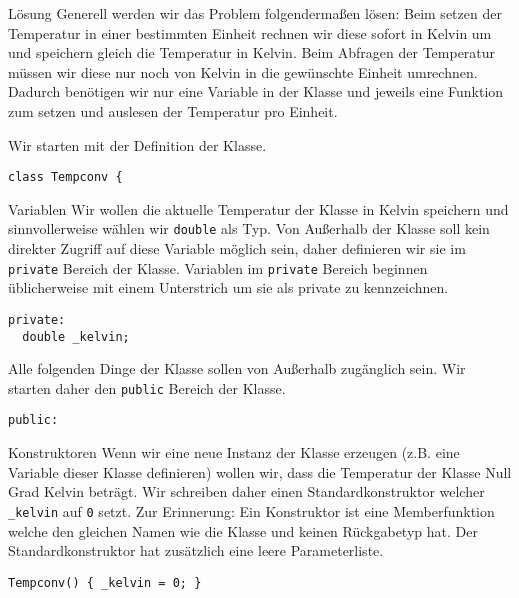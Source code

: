 \documentclass[presentation]{beamer}
\begin{document}
\begin{frame}[label={sec:org40f99e4},fragile]{Lösung}
 Generell werden wir das Problem folgendermaßen lösen: Beim setzen der
Temperatur in einer bestimmten Einheit rechnen wir diese sofort in
Kelvin um und speichern gleich die Temperatur in Kelvin. Beim Abfragen
der Temperatur müssen wir diese nur noch von Kelvin in die gewünschte
Einheit umrechnen. Dadurch benötigen wir nur eine Variable in der
Klasse und jeweils eine Funktion zum setzen und auslesen der
Temperatur pro Einheit.

Wir starten mit der Definition der Klasse.
\begin{verbatim}
class Tempconv {
\end{verbatim}

\begin{block}{Variablen}
Wir wollen die aktuelle Temperatur der Klasse in Kelvin speichern und
sinnvollerweise wählen wir {\color{solarizedYellow}\verb!double!} als Typ. Von Außerhalb der Klasse
soll kein direkter Zugriff auf diese Variable möglich sein, daher
definieren wir sie im {\color{solarizedYellow}\verb!private!} Bereich der Klasse. Variablen im
{\color{solarizedYellow}\verb!private!} Bereich beginnen üblicherweise mit einem Unterstrich um sie
als private zu kennzeichnen.
\begin{verbatim}
private:
  double _kelvin;
\end{verbatim}

Alle folgenden Dinge der Klasse sollen von Außerhalb zugänglich sein.
Wir starten daher den {\color{solarizedYellow}\verb!public!} Bereich der Klasse.
\begin{verbatim}
public:
\end{verbatim}
\end{block}

\begin{block}{Konstruktoren}
Wenn wir eine neue Instanz der Klasse erzeugen (z.B. eine Variable
dieser Klasse definieren) wollen wir, dass die Temperatur der Klasse
Null Grad Kelvin beträgt. Wir schreiben daher einen
Standardkonstruktor welcher {\color{solarizedYellow}\verb!_kelvin!} auf {\color{solarizedYellow}\verb!0!} setzt. Zur Erinnerung:
Ein Konstruktor ist eine Memberfunktion welche den \alert{gleichen Namen}
wie die Klasse und \alert{keinen Rückgabetyp} hat. Der Standardkonstruktor
hat zusätzlich eine \alert{leere Parameterliste}.
\begin{verbatim}
Tempconv() { _kelvin = 0; }
\end{verbatim}
\end{block}


\end{frame}
\end{document}
